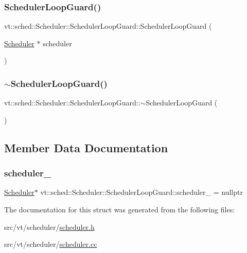 \subsubsection{\texorpdfstring{Scheduler\+Loop\+Guard()}{SchedulerLoopGuard()}}
{\footnotesize\ttfamily vt\+::sched\+::\+Scheduler\+::\+Scheduler\+Loop\+Guard\+::\+Scheduler\+Loop\+Guard (\begin{DoxyParamCaption}\item[{\hyperlink{structvt_1_1sched_1_1_scheduler}{Scheduler} $\ast$}]{scheduler }\end{DoxyParamCaption})}

\mbox{\label{structvt_1_1sched_1_1_scheduler_1_1_scheduler_loop_guard_a99f568ec1bd01de497ee706c005087c8}} 
\subsubsection{\texorpdfstring{$\sim$\+Scheduler\+Loop\+Guard()}{~SchedulerLoopGuard()}}
{\footnotesize\ttfamily vt\+::sched\+::\+Scheduler\+::\+Scheduler\+Loop\+Guard\+::$\sim$\+Scheduler\+Loop\+Guard (\begin{DoxyParamCaption}{ }\end{DoxyParamCaption})}



\subsection{Member Data Documentation}
\mbox{\label{structvt_1_1sched_1_1_scheduler_1_1_scheduler_loop_guard_a5af77be3e6a48d4d21c6936c8148a35f}} 
\subsubsection{\texorpdfstring{scheduler\+\_\+}{scheduler\_}}
{\footnotesize\ttfamily \hyperlink{structvt_1_1sched_1_1_scheduler}{Scheduler}$\ast$ vt\+::sched\+::\+Scheduler\+::\+Scheduler\+Loop\+Guard\+::scheduler\+\_\+ = nullptr\hspace{0.3cm}{\ttfamily [private]}}



The documentation for this struct was generated from the following files\+:\begin{DoxyCompactItemize}
\item 
src/vt/scheduler/\hyperlink{scheduler_8h}{scheduler.\+h}\item 
src/vt/scheduler/\hyperlink{scheduler_8cc}{scheduler.\+cc}\end{DoxyCompactItemize}
